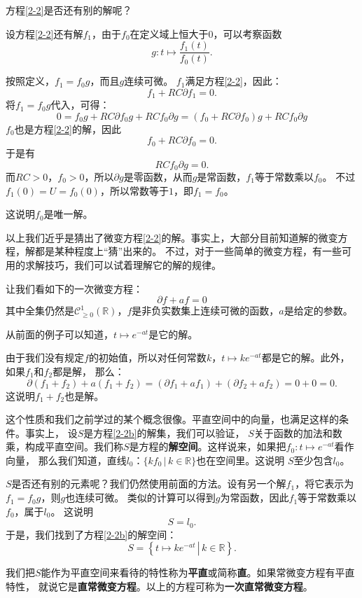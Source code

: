 \documentclass[12pt,UTF8]{ctexbook}
\theoremstyle{definition}
\theoremstyle{plain}
\begin{document}
方程\eqref{2-2}是否还有别的解呢？

设方程\eqref{2-2}还有解$f_1$，由于$f_0$在定义域上恒大于$0$，可以考察函数
$$ g : t \mapsto \frac{f_1(t)}{f_0(t)}. $$

按照定义，$f_1 = f_0 g$，而且$g$连续可微。
$f_1$满足方程\eqref{2-2}，因此：
$$ f_1 + RC \partial f_1 = 0.$$
将$f_1 = f_0 g$代入，可得：
$$ 0 = f_0 g + RC \partial f_0 g + RC f_0 \partial g = (f_0 + RC \partial f_0) g + RC f_0 \partial g $$
$f_0$也是方程\eqref{2-2}的解，因此
$$ f_0 + RC\partial f_0 = 0.$$
于是有
$$ RC f_0 \partial g = 0. $$
而$RC>0$，$f_0>0$，所以$\partial g$是零函数，从而$g$是常函数，$f_1$等于常数乘以$f_0$。
不过$f_1(0) = U = f_0(0)$，所以常数等于$1$，即$f_1 = f_0$。

这说明$f_0$是唯一解。

以上我们近乎是猜出了微变方程\eqref{2-2}的解。事实上，大部分目前知道解的微变方程，解都是某种程度上“猜”出来的。
不过，对于一些简单的微变方程，有一些可用的求解技巧，我们可以试着理解它的解的规律。

让我们看如下的一次微变方程：
\begin{equation}
    \partial f + af = 0 \label{2-2b}
\end{equation}
其中全集仍然是$\mathcal{C}^1_{\geqslant 0}(\mathbb{R})$，$f$是非负实数集上连续可微的函数，$a$是给定的参数。

从前面的例子可以知道，$t\mapsto e^{-at}$是它的解。

由于我们没有规定$f$的初始值，所以对任何常数$k$，$t\mapsto ke^{-at}$都是它的解。此外，如果$f_1$和$f_2$都是解，
那么：
$$ \partial (f_1 + f_2) + a(f_1 + f_2) = (\partial f_1 + af_1) + (\partial f_2 + af_2) = 0 + 0 = 0. $$
这说明$f_1 + f_2$也是解。

这个性质和我们之前学过的某个概念很像。平直空间中的向量，也满足这样的条件。事实上，
设$S$是方程\eqref{2-2b}的解集，我们可以验证，
$S$关于函数的加法和数乘，构成平直空间。我们称$S$是方程的\textbf{解空间}。这样说来，如果把$f_0:t\mapsto e^{-at}$看作向量，
那么我们知道，直线$l_0$：$\{kf_0 \, | \, k\in\mathbb{R}\}$也在空间里。这说明
$S$至少包含$l_0$。

$S$是否还有别的元素呢？我们仍然使用前面的方法。设有另一个解$f_1$，将它表示为$f_1 = f_0 g$，则$g$也连续可微。
类似的计算可以得到$g$为常函数，因此$f_1$等于常数乘以$f_0$，属于$l_0$。
这说明
$$S = l_0.$$
于是，我们找到了方程\eqref{2-2b}的解空间：
$$S = \left\{\left.t\mapsto ke^{-at} \, \right| \, k\in\mathbb{R}\right\}.$$

我们把$S$能作为平直空间来看待的特性称为\textbf{平直}或简称\textbf{直}。如果常微变方程有平直特性，
就说它是\textbf{直常微变方程}。以上的方程可称为\textbf{一次直常微变方程}。
\end{document}
